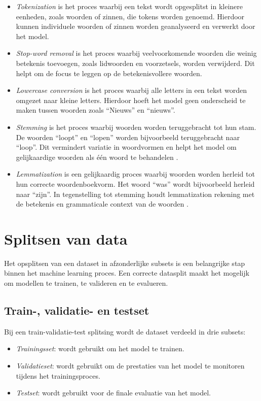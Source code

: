 \begin{itemize}
    \item \textit{Tokenization} is het proces waarbij een tekst wordt opgesplitst in kleinere eenheden, zoals woorden of zinnen, die tokens worden genoemd. Hierdoor kunnen individuele woorden of zinnen worden geanalyseerd en verwerkt door het model.
    \item \textit{Stop-word removal} is het proces waarbij veelvoorkomende woorden die weinig betekenis toevoegen, zoals lidwoorden en voorzetsels, worden verwijderd. Dit helpt om de focus te leggen op de betekenisvollere woorden.
    \item \textit{Lowercase conversion} is het proces waarbij alle letters in een tekst worden omgezet naar kleine letters. Hierdoor hoeft het model geen onderscheid te maken tussen woorden zoals ``Nieuws'' en ``nieuws''.
    \item \textit{Stemming} is het proces waarbij woorden worden teruggebracht tot hun stam. De woorden ``loopt'' en ``lopen'' worden bijvoorbeeld teruggebracht naar ``loop''. Dit vermindert variatie in woordvormen en helpt het model om gelijkaardige woorden als één woord te behandelen \autocite{Uysal2014}.
    \item \textit{Lemmatization} is een gelijkaardig proces waarbij woorden worden herleid tot hun correcte woordenboekvorm. Het woord ``was'' wordt bijvoorbeeld herleid naar ``zijn''. In tegenstelling tot stemming houdt lemmatization rekening met de betekenis en grammaticale context van de woorden \autocite{Islam2025}.
\end{itemize}

\section{Splitsen van data}
\label{sec:splitsen-van-data}

Het opsplitsen van een dataset in afzonderlijke subsets is een belangrijke stap binnen het machine learning proces. Een correcte datasplit maakt het mogelijk om modellen te trainen, te valideren en te evalueren.

\subsection{Train-, validatie- en testset}

Bij een train-validatie-test splitsing wordt de dataset verdeeld in drie subsets:

\begin{itemize}
    \item \textit{Trainingsset}: wordt gebruikt om het model te trainen.
    \item \textit{Validatieset}: wordt gebruikt om de prestaties van het model te monitoren tijdens het trainingsproces.
    \item \textit{Testset}: wordt gebruikt voor de finale evaluatie van het model.
\end{itemize}

